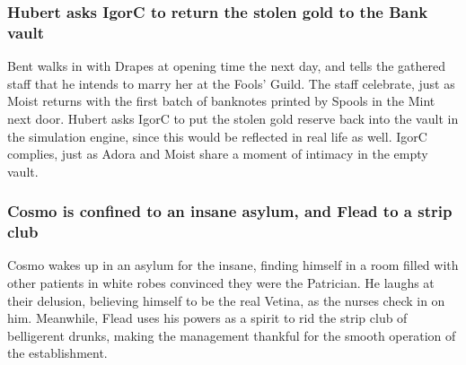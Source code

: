 \subsubsection{\Gls{Hubert} asks \Gls{IgorC} to return the stolen gold to the Bank vault}
\Gls{Bent} walks in with \Gls{Drapes} at opening time the next day, and tells the gathered staff
that he intends to marry her at the Fools' Guild. The staff celebrate, just as \Gls{Moist} returns
with the first batch of banknotes printed by \Gls{Spools} in the Mint next door. \Gls{Hubert} asks
\Gls{IgorC} to put the stolen gold reserve back into the vault in the simulation engine, since this
would be reflected in real life as well. \Gls{IgorC} complies, just as \Gls{Adora} and \Gls{Moist}
share a moment of intimacy in the empty vault.

\subsubsection{\Gls{Cosmo} is confined to an insane asylum, and \Gls{Flead} to a strip club}
\Gls{Cosmo} wakes up in an asylum for the insane, finding himself in a room filled with other
patients in white robes convinced they were the Patrician. He laughs at their delusion, believing
himself to be the real \Gls{Vetina}, as the nurses check in on him. Meanwhile, \Gls{Flead} uses his
powers as a spirit to rid the strip club of belligerent drunks, making the management thankful for
the smooth operation of the establishment.
